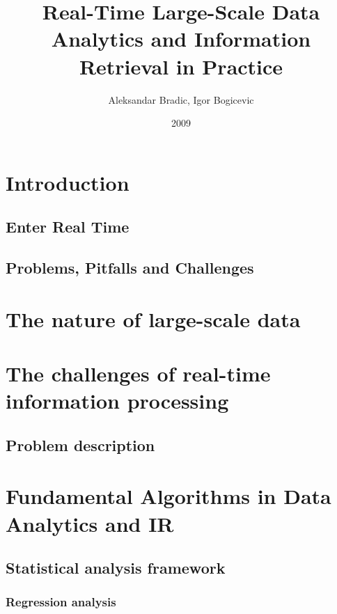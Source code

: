 \documentclass[]{book}    %
\begin{document}
\author{Aleksandar Bradic, Igor Bogicevic}
\date{2009}
\title{Real-Time Large-Scale Data Analytics and Information Retrieval in Practice}

\maketitle 

  \frontmatter 
  \tableofcontents 


\mainmatter 

\chapter{Introduction}
\label{altrings} %

\section{Enter Real Time}
\section{Problems, Pitfalls and Challenges}

\chapter{The nature of large-scale data}

\chapter{The challenges of real-time information processing}
\section{Problem description}

\chapter{Fundamental Algorithms in Data Analytics and IR}
\section{Statistical analysis framework}
\subsection{Regression analysis}
\end{document}
